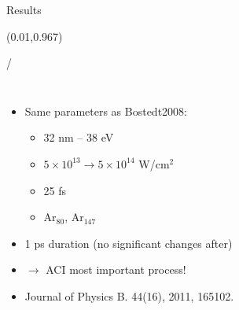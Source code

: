 \documentclass{beamer}
\makeatletter
\newcommand{\framenumber}{
\begin{textblock}{0}(0.01,0.967)
\begin{scriptsize}
{\color{gray}\insertframenumber/\inserttotalframenumber}
\end{scriptsize}
\end{textblock}
}
\makeatother
\begin{document}
\begin{frame}{Results}\framenumber


\begin{columns}
		\begin{itemize}
		\item Same parameters as Bostedt2008:
		\begin{itemize}
			\item 32 nm -- 38 eV
			\item $5\times10^{13} \rightarrow 5\times10^{14}$ W/cm$^2$
			\item 25 fs
			\item Ar$_{80}$, Ar$_{147}$
		\end{itemize}
		\item 1 ps duration (no significant changes after)
        \item<6-> {\color{red}$\rightarrow$ ACI most important process!}
        \item<7->{
            Journal of Physics B. 44(16), 2011, 165102.
        }
		\end{itemize}

\begin{center}


\end{center}
\end{columns}
\end{frame}
\end{document}
